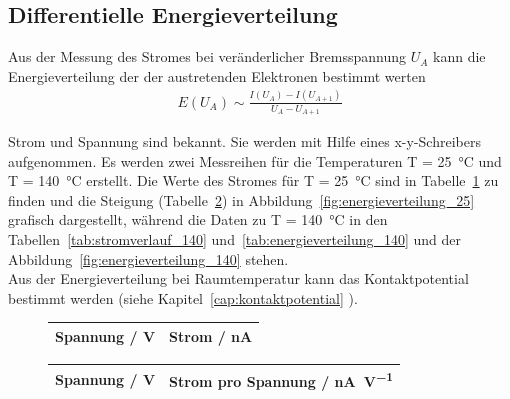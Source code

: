 \subsection{Differentielle Energieverteilung} \label{sec:auswertung1}
Aus der Messung des Stromes bei veränderlicher Bremsspannung $U_A$ kann die Energieverteilung der der austretenden Elektronen bestimmt werten
\begin{align}
	E(U_A) \sim \frac{I(U_A)-I(U_{A+1})}{U_A - U_{A+1}}
\end{align}

Strom und Spannung sind bekannt. Sie werden mit Hilfe eines x-y-Schreibers aufgenommen. Es werden zwei Messreihen für die Temperaturen T = \SI{25}{\celsius} und T = \SI{140}{\celsius} erstellt. Die Werte des Stromes für T = \SI{25}{\celsius} sind in Tabelle~\ref{tab:stromverlauf_25} zu finden und die Steigung  (Tabelle~\ref{tab:energieverteilung_25}) in Abbildung~\ref{fig:energieverteilung_25} grafisch dargestellt, während die Daten zu T = \SI{140}{\celsius} in den Tabellen~\ref{tab:stromverlauf_140} und~\ref{tab:energieverteilung_140} und der Abbildung~\ref{fig:energieverteilung_140}  stehen. \\
Aus der Energieverteilung bei Raumtemperatur kann das Kontaktpotential bestimmt werden (siehe Kapitel~\ref{cap:kontaktpotential} ).




\begin{figure}
	\centering
	\begin{tabular}{cc}
		Spannung / \si{\volt} & Strom /  \si{\nano\ampere}   \\
		\hline
		
	\end{tabular}
	\label{tab:stromverlauf_25}
\end{figure}

\begin{figure}
	\centering
	\begin{tabular}{cc}
		Spannung / \si{\volt} & Strom pro Spannung / \si{\nano\ampere\per\volt}   \\
		\hline
		
	\end{tabular}
	\label{tab:energieverteilung_25}
\end{figure}


